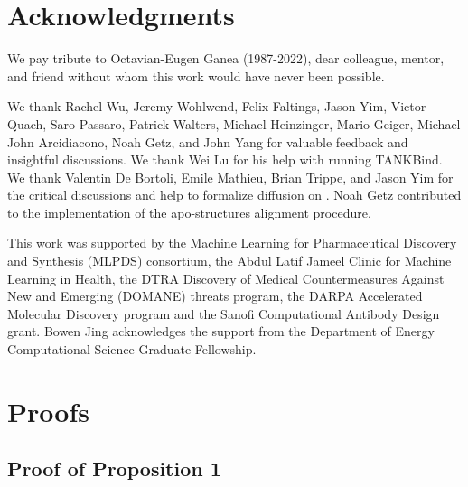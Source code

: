 \documentclass{article} \usepackage{iclr2023_conference,times}
\begin{document}
\section*{Acknowledgments}

We pay tribute to Octavian-Eugen Ganea (1987-2022), dear colleague, mentor, and friend without whom this work would have never been possible. 

We thank Rachel Wu, Jeremy Wohlwend, Felix Faltings, Jason Yim, Victor Quach, Saro Passaro, Patrick Walters, Michael Heinzinger, Mario Geiger, Michael John Arcidiacono, Noah Getz, and John Yang for valuable feedback and insightful discussions. We thank Wei Lu for his help with running TANKBind. We thank Valentin De Bortoli, Emile Mathieu, Brian Trippe, and Jason Yim for the critical discussions and help to formalize diffusion on . Noah Getz contributed to the implementation of the apo-structures alignment procedure. 

This work was supported by the Machine Learning for Pharmaceutical Discovery and Synthesis (MLPDS) consortium, the Abdul Latif Jameel Clinic for Machine Learning in Health, the DTRA Discovery of Medical Countermeasures Against New and Emerging (DOMANE) threats program, the DARPA Accelerated Molecular Discovery program and the Sanofi Computational Antibody Design grant. Bowen Jing acknowledges the support from the Department of Energy Computational Science Graduate Fellowship.



\newpage
\appendix

\section{Proofs} \label{app:proofs}

\subsection{Proof of Proposition 1}
\end{document}

